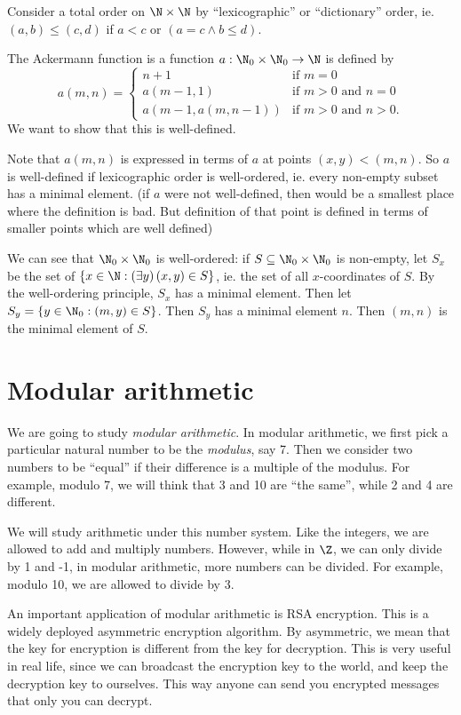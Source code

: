 \documentclass[a4paper]{article}
\begin{document}
\begin{eg}
  Consider a total order on $\N\times \N$ by ``lexicographic'' or ``dictionary'' order, ie. $(a, b) \leq (c, d)$ if $a < c$ or $(a = c\wedge b\leq d)$.

  The Ackermann function is a function $a:\N_0\times \N_0 \to \N$ is defined by
  \[
    a(m, n) =\begin{cases}n+1 & \mbox{if } m = 0 \\a(m-1, 1) & \mbox{if } m > 0 \mbox{ and } n = 0 \\a(m-1, a(m, n-1)) & \mbox{if } m > 0 \mbox{ and } n > 0.\end{cases}
  \]
  We want to show that this is well-defined.

  Note that $a(m, n)$ is expressed in terms of $a$ at points $(x, y) < (m, n)$. So $a$ is well-defined if lexicographic order is well-ordered, ie. every non-empty subset has a minimal element. (if $a$ were not well-defined, then would be a smallest place where the definition is bad. But definition of that point is defined in terms of smaller points which are well defined)

  We can see that $\N_0\times \N_0$ is well-ordered: if $S\subseteq \N_0\times \N_0$ is non-empty, let $S_x$ be the set of $\{x\in \N: (\exists y)\,(x, y)\in S\}$, ie. the set of all $x$-coordinates of $S$. By the well-ordering principle, $S_x$ has a minimal element. Then let $S_y = \{y\in \N_0: (m, y)\in S\}$. Then $S_y$ has a minimal element $n$. Then $(m, n)$ is the minimal element of $S$.
\end{eg}

\section{Modular arithmetic}
We are going to study \emph{modular arithmetic}. In modular arithmetic, we first pick a particular natural number to be the \emph{modulus}, say 7. Then we consider two numbers to be ``equal'' if their difference is a multiple of the modulus. For example, modulo 7, we will think that 3 and 10 are ``the same'', while 2 and 4 are different.

We will study arithmetic under this number system. Like the integers, we are allowed to add and multiply numbers. However, while in $\Z$, we can only divide by 1 and -1, in modular arithmetic, more numbers can be divided. For example, modulo 10, we are allowed to divide by 3.

An important application of modular arithmetic is RSA encryption. This is a widely deployed asymmetric encryption algorithm. By asymmetric, we mean that the key for encryption is different from the key for decryption. This is very useful in real life, since we can broadcast the encryption key to the world, and keep the decryption key to ourselves. This way anyone can send you encrypted messages that only you can decrypt.
\end{document}
